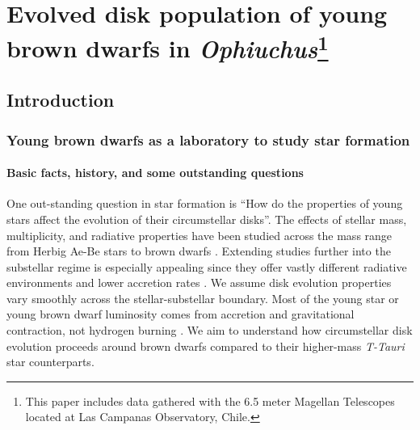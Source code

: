 \chapter{Evolved disk population of young brown dwarfs in \emph{Ophiuchus}\footnote{This paper includes data gathered with the 6.5 meter Magellan Telescopes located at Las Campanas Observatory, Chile.}}


\maketitle

\section{Introduction}

\subsection{Young brown dwarfs as a laboratory to study star formation}

\subsubsection{Basic facts, history, and some outstanding questions}
One out-standing question in star formation is ``How do the properties of young stars affect the evolution of their circumstellar disks''.  The effects of stellar mass, multiplicity, and radiative properties have been studied across the mass range from Herbig Ae-Be stars to brown dwarfs \citep{2011ARA&A..49...67W}.  Extending studies further into the substellar regime is especially appealing since they offer vastly different radiative environments and lower accretion rates \citep{2003ApJ...592..266M,2009ApJ...696.1589H}.  We assume disk evolution properties vary smoothly across the stellar-substellar boundary.  Most of the young star or young brown dwarf luminosity comes from accretion and gravitational contraction, not hydrogen burning \citep{2003A&A...402..701B}.  We aim to understand how circumstellar disk evolution proceeds around brown dwarfs compared to their higher-mass \emph{T-Tauri} star counterparts.



